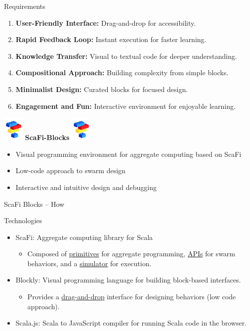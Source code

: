 \documentclass[aspectratio=169]{beamer}
\begin{document}
\begin{frame}{Requirements}
	\begin{enumerate}
    \item \textbf{User-Friendly Interface:} Drag-and-drop for accessibility.
    \item \textbf{Rapid Feedback Loop:} Instant execution for faster learning.
    \item \textbf{Knowledge Transfer:} Visual to textual code for deeper understanding.
    \item \textbf{Compositional Approach:} Building complexity from simple blocks.
    \item \textbf{Minimalist Design:} Curated blocks for focused design.
    \item \textbf{Engagement and Fun:} Interactive environment for enjoyable learning.
\end{enumerate}

\end{frame}
\begin{frame}[standout]
	\includegraphics[width=1cm]{img/scafiblocks-logo.png}
	\Huge{\textbf{ScaFi-Blocks}}
	\includegraphics[width=1cm]{img/scafiblocks-logo.png}
	\Large{
		\begin{itemize}
			\item \alert{Visual programming environment} for aggregate computing based on ScaFi
			\item \alert{Low-code} approach to swarm design
			\item \alert{Interactive} and \alert{intuitive} design and debugging
		\end{itemize}}
\end{frame}
\begin{frame}{ScaFi Blocks -- How}
	\begin{block}{Technologies}
		\begin{itemize}
			\item \alert{ScaFi:} Aggregate computing library for Scala
			\begin{itemize}
				\item Composed of \underline{primitives} for aggregate programming, \underline{APIs} for swarm behaviors, and a \underline{simulator} for execution.
			\end{itemize}
			\item \alert{Blockly:} Visual programming language for building block-based interfaces.
			\begin{itemize}
				\item Provides a \underline{drag-and-drop} interface for designing behaviors (low code approach).
			\end{itemize}
			\item \alert{Scala.js:} Scala to JavaScript compiler for running Scala code in the browser.
		\end{itemize}
	\end{block}
\end{frame}
\end{document}

